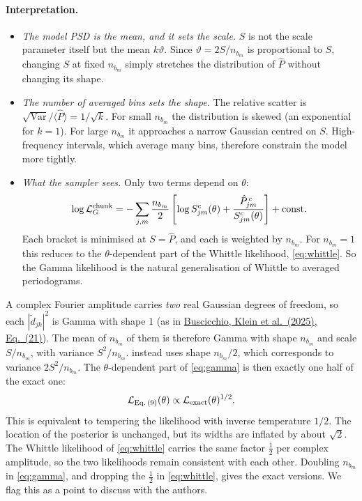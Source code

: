 \documentclass[11pt,a4paper]{article}
\newcommand{\urlPtwo}{https://arxiv.org/pdf/2410.08263}
\newcommand{\PtwoEq}[1]{\href{\urlPtwo}{Buscicchio, Klein et al.~(2025), Eq.~(#1)}}
\newcommand{\Pbar}{\hat{P}}
\begin{document}
\paragraph{Interpretation.}
\begin{itemize}
  \item \emph{The model PSD is the mean, and it sets the scale.} $S$ is not the
        scale parameter itself but the mean $k\vartheta$. Since
        $\vartheta = 2S/n_{b_m}$ is proportional to $S$, changing $S$ at fixed
        $n_{b_m}$ simply stretches the distribution of $\Pbar$ without changing its
        shape.
  \item \emph{The number of averaged bins sets the shape.} The relative scatter is
        $\sqrt{\mathrm{Var}}/\langle\Pbar\rangle = 1/\sqrt{k}$. For small $n_{b_m}$
        the distribution is skewed (an exponential for $k=1$). For large $n_{b_m}$ it
        approaches a narrow Gaussian centred on $S$. High-frequency intervals, which
        average many bins, therefore constrain the model more tightly.
  \item \emph{What the sampler sees.} Only two terms depend on $\theta$:
        \begin{equation}
          \log\mathcal{L}^{\rm chunk}_G = -\sum_{j,m}\frac{n_{b_m}}{2}
          \left[\log S^c_{jm}(\theta) + \frac{\Pbar^{\,c}_{jm}}{S^c_{jm}(\theta)}\right] + \text{const}.
        \end{equation}
        Each bracket is minimised at $S=\Pbar$, and each is weighted by $n_{b_m}$.
        For $n_{b_m}=1$ this reduces to the $\theta$-dependent part of the Whittle
        likelihood, \cref{eq:whittle}. So the Gamma likelihood is the natural
        generalisation of Whittle to averaged periodograms.
\end{itemize}

\begin{remark}
A complex Fourier amplitude carries \emph{two} real Gaussian degrees of freedom, so
each $|\tilde d_{jk}|^2$ is Gamma with shape $1$ (as in \PtwoEq{21}). The mean of
$n_{b_m}$ of them is therefore Gamma with shape $n_{b_m}$ and scale $S/n_{b_m}$,
with variance $S^2/n_{b_m}$.  instead uses shape $n_{b_m}/2$, which
corresponds to variance $2S^2/n_{b_m}$. The $\theta$-dependent part of
\cref{eq:gamma} is then exactly one half of the exact one:
\[
  \mathcal{L}_{\rm Eq.\,(9)}(\theta) \propto \mathcal{L}_{\rm exact}(\theta)^{1/2}.
\]
This is equivalent to tempering the likelihood with inverse temperature $1/2$. The
location of the posterior is unchanged, but its widths are inflated by about
$\sqrt2$. The Whittle likelihood of \cref{eq:whittle} carries the same factor
$\tfrac12$ per complex amplitude, so the two likelihoods remain consistent with each
other. Doubling $n_{b_m}$ in \cref{eq:gamma}, and dropping the $\tfrac12$ in
\cref{eq:whittle}, gives the exact versions. We flag this as a point to discuss with
the authors.
\end{remark}
\end{document}
